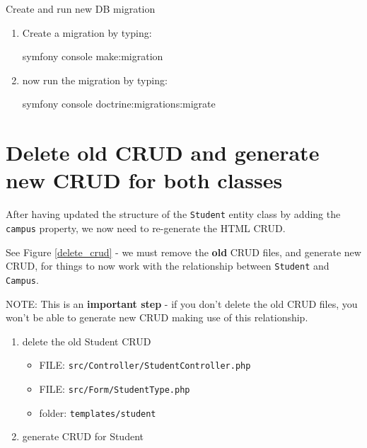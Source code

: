 \documentclass[a4paperpaper,openright]{book}
\newenvironment{Shaded}{}{}
\newcommand{\ExtensionTok}[1]{#1}
\newcommand{\NormalTok}[1]{#1}
\providecommand{\tightlist}{%
  \setlength{\itemsep}{0pt}\setlength{\parskip}{0pt}}
\begin{document}
Create and run new DB migration

\begin{enumerate}
\def\labelenumi{\arabic{enumi}.}
\item
  Create a migration by typing:

\begin{Shaded}
\begin{Highlighting}[]
\ExtensionTok{symfony}\NormalTok{ console make:migration}
\end{Highlighting}
\end{Shaded}
\item
  now run the migration by typing:

\begin{Shaded}
\begin{Highlighting}[]
\ExtensionTok{symfony}\NormalTok{ console doctrine:migrations:migrate}
\end{Highlighting}
\end{Shaded}
\end{enumerate}

\hypertarget{delete-old-crud-and-generate-new-crud-for-both-classes}{%
\section{Delete old CRUD and generate new CRUD for both
classes}\label{delete-old-crud-and-generate-new-crud-for-both-classes}}

After having updated the structure of the \texttt{Student} entity class
by adding the \texttt{campus} property, we now need to re-generate the
HTML CRUD.

See Figure \ref{delete_crud} - we must remove the \textbf{old} CRUD
files, and generate new CRUD, for things to now work with the
relationship between \texttt{Student} and \texttt{Campus}.

NOTE: This is an \textbf{important step} - if you don't delete the old
CRUD files, you won't be able to generate new CRUD making use of this
relationship.

\begin{enumerate}
\def\labelenumi{\arabic{enumi}.}
\tightlist
\item
  delete the old Student CRUD

  \begin{itemize}
  \tightlist
  \item
    FILE: \texttt{src/Controller/StudentController.php}
  \item
    FILE: \texttt{src/Form/StudentType.php}
  \item
    folder: \texttt{templates/student}
  \end{itemize}
\item
  generate CRUD for Student
\end{enumerate}
\end{document}
